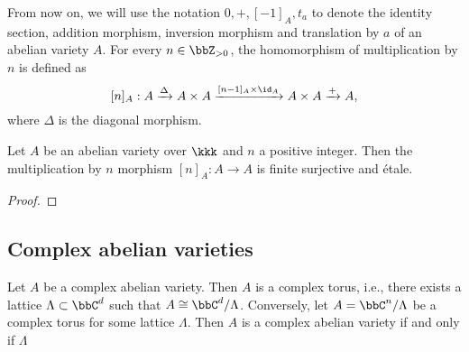     From now on, we will use the notation \(0, +, [-1]_A, t_a\) to denote the identity section, addition morphism, inversion morphism and translation by \(a\) of an abelian variety \(A\).
    For every \(n \in \bbZ_{>0}\), the homomorphism of multiplication by \(n\) is defined as 
    \[ [n]_A: A \xrightarrow{\Delta} A \times A \xrightarrow{[n-1]_A\times \id_A} A \times A \xrightarrow{+} A, \]
    where \(\Delta\) is the diagonal morphism.

    \begin{proposition}\label{prop: multiplication by n is etale}
        Let \(A\) be an abelian variety over \(\kkk\) and \(n\) a positive integer.
        Then the multiplication by \(n\) morphism \([n]_A: A \to A\) is finite surjective and \'etale.
    \end{proposition}
    \begin{proof}
    \end{proof}

\subsection{Complex abelian varieties}

    \begin{theorem}\label{thm: complex abelian varieties are complex tori}
        Let \(A\) be a complex abelian variety.
        Then \(A\) is a complex torus, i.e., there exists a lattice \(\Lambda \subset \bbC^d\) such that \(A \cong \bbC^d / \Lambda\).
        Conversely, let \(A = \bbC^n/\Lambda\) be a complex torus for some lattice \(\Lambda\).
        Then \(A\) is a complex abelian variety if and only if \(\Lambda\)  
    \end{theorem}


